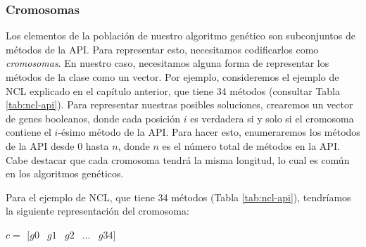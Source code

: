 


\subsubsection{Cromosomas}
\label{ge:cromosomas}

Los elementos de la población de nuestro algoritmo genético son subconjuntos de métodos de la API. Para representar esto, necesitamos codificarlos como \emph{cromosomas}. En nuestro caso, necesitamos alguna forma de representar los métodos de la clase como un vector. Por ejemplo, consideremos el ejemplo de NCL explicado en el capítulo anterior, que tiene 34 métodos (consultar Tabla \ref{tab:ncl-api}). Para representar nuestras posibles soluciones, crearemos un vector de genes booleanos, donde cada posición $i$ es verdadera si y solo si el cromosoma contiene el $i$-ésimo método de la API. Para hacer esto, enumeraremos los métodos de la API desde 0 hasta $n$, donde $n$ es el número total de métodos en la API. Cabe destacar que cada cromosoma tendrá la misma longitud, lo cual es común en los algoritmos genéticos.

Para el ejemplo de NCL, que tiene 34 métodos (Tabla \ref{tab:ncl-api}), tendríamos la siguiente representación del cromosoma:

\begin{center}
$c = \begin{array}{ccccccc}
[ g0 & g1 & g2 & \ldots & g34 ]
\end{array}$
\end{center}

